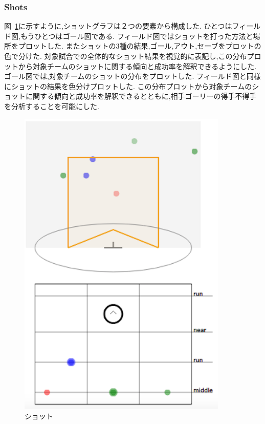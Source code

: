 \documentclass[sotsuron]{kuee}
\begin{document}
			\subsubsection{Shots}
				図~\ref{fig:shots}に示すように,ショットグラフは２つの要素から構成した. ひとつはフィールド図,もうひとつはゴール図である. 
				フィールド図ではショットを打った方法と場所をプロットした. またショットの3種の結果,ゴール,アウト,セーブをプロットの色で分けた. 対象試合での全体的なショット結果を視覚的に表記し,この分布プロットから対象チームのショットに関する傾向と成功率を解釈できるようにした. 
				ゴール図では,対象チームのショットの分布をプロットした. フィールド図と同様にショットの結果を色分けプロットした. この分布プロットから対象チームのショットに関する傾向と成功率を解釈できるとともに,相手ゴーリーの得手不得手を分析することを可能にした. 
					\begin{figure}
						\begin{center}
							\includegraphics[width=10cm]{./png/shots.png}
						\end{center}
						\caption{ショット}
				  		\label{fig:shots}
					\end{figure}
\end{document}
